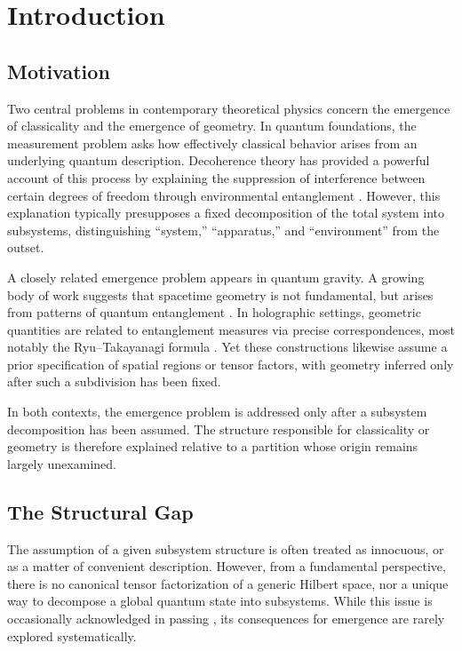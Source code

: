 \documentclass[12pt,a4paper,openany]{book}
\begin{document}
\section{Introduction}

\subsection{Motivation}

Two central problems in contemporary theoretical physics concern the emergence of classicality and the emergence of geometry. 
In quantum foundations, the measurement problem asks how effectively classical behavior arises from an underlying quantum description. 
Decoherence theory has provided a powerful account of this process by explaining the suppression of interference between certain degrees of freedom through environmental entanglement \cite{Zurek2003}. 
However, this explanation typically presupposes a fixed decomposition of the total system into subsystems, distinguishing ``system,'' ``apparatus,'' and ``environment'' from the outset.

A closely related emergence problem appears in quantum gravity. 
A growing body of work suggests that spacetime geometry is not fundamental, but arises from patterns of quantum entanglement \cite{Maldacena1999,VanRaamsdonk2010}. 
In holographic settings, geometric quantities are related to entanglement measures via precise correspondences, most notably the Ryu--Takayanagi formula \cite{RyuTakayanagi2006}. 
Yet these constructions likewise assume a prior specification of spatial regions or tensor factors, with geometry inferred only after such a subdivision has been fixed.

In both contexts, the emergence problem is addressed only after a subsystem decomposition has been assumed.
The structure responsible for classicality or geometry is therefore explained relative to a partition whose origin remains largely unexamined.

\subsection{The Structural Gap}

The assumption of a given subsystem structure is often treated as innocuous, or as a matter of convenient description. 
However, from a fundamental perspective, there is no canonical tensor factorization of a generic Hilbert space, nor a unique way to decompose a global quantum state into subsystems.
While this issue is occasionally acknowledged in passing \cite{Zanardi2004,Viola2004}, its consequences for emergence are rarely explored systematically.
\end{document}
